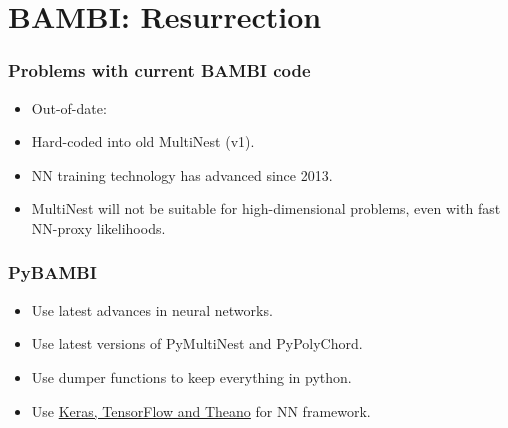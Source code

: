 \documentclass[%
    handout
]{beamer}
\begin{document}
\section{BAMBI\@: Resurrection}
\begin{frame}
  \frametitle{Problems with current BAMBI code} 
    \begin{itemize}
        \item Out-of-date: 
        \item Hard-coded into old MultiNest (v1). 
        \item NN training technology has advanced since 2013.
        \item MultiNest will not be suitable for high-dimensional problems, even with fast NN-proxy likelihoods.
    \end{itemize}

\end{frame}


\begin{frame}
  \frametitle{PyBAMBI} 
    \begin{itemize}
        \item Use latest advances in neural networks.
        \item Use latest versions of PyMultiNest and PyPolyChord.
        \item Use dumper functions to keep everything in python.
        \item Use \href{https://keras.io/}{Keras, TensorFlow and Theano} for NN framework.
    \end{itemize}
\end{frame}
\end{document}
